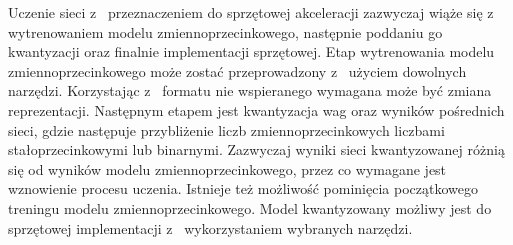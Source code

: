 Uczenie sieci z~ przeznaczeniem do sprzętowej akceleracji zazwyczaj wiąże się z~ wytrenowaniem modelu zmiennoprzecinkowego, następnie poddaniu go kwantyzacji oraz finalnie implementacji sprzętowej.
Etap wytrenowania modelu zmiennoprzecinkowego może zostać przeprowadzony z~ użyciem
dowolnych narzędzi.
Korzystając z~ formatu nie wspieranego wymagana może być zmiana reprezentacji.
Następnym etapem jest kwantyzacja wag oraz wyników pośrednich sieci, gdzie następuje przybliżenie liczb zmiennoprzecinkowych liczbami stałoprzecinkowymi lub binarnymi. 
Zazwyczaj wyniki sieci kwantyzowanej różnią się od wyników modelu zmiennoprzecinkowego, przez co wymagane jest wznowienie procesu uczenia.
Istnieje też możliwość pominięcia początkowego treningu modelu zmiennoprzecinkowego.
Model kwantyzowany możliwy jest do sprzętowej implementacji z~ wykorzystaniem wybranych narzędzi.

